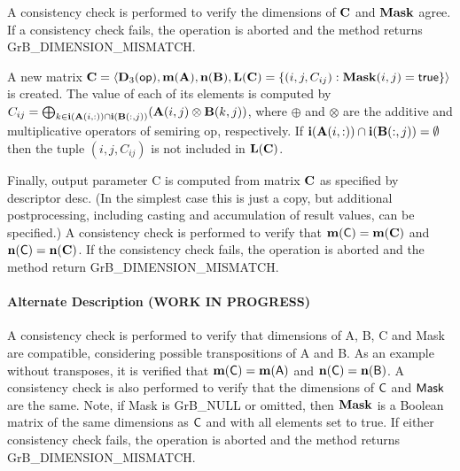 A consistency check is performed to verify the dimensions of ${\bf C}$
and ${\bf Mask}$ agree.  If a consistency check fails, the operation is
aborted and the method returns {\sf GrB\_DIMENSION\_MISMATCH}.

A new matrix ${\bf C} = \langle \bold{D}_3({\sf op}),
\bold{m}({\bf A}), \bold{n}({\bf B}), \bold{L}({\bf C}) = \{(i,j,C_{ij}) : {\bf Mask}(i,j)
= {\sf true} \} \rangle$ is created.  The value of each of its elements
is computed by $C_{ij} = \bigoplus_{k \in {\bf i}({\bf A}(i,:)) \cap
{\bf i}({\bf B}(:,j))} ({\bf A}(i,j) \otimes {\bf B}(k,j))$,
where $\oplus$ and $\otimes$ are the additive and multiplicative
operators of semiring {\sf op}, respectively.  If ${\bf i}({\bf A}(i,:)) \cap {\bf i}({\bf B}(:,j)) = \emptyset $ then the tuple $(i,j,C_{ij})$
is not included in $\bold{L}({\bf C})$.

Finally, output parameter {\sf C} is computed from matrix ${\bf C}$
as specified by descriptor {\sf desc}. (In the simplest case this
is just a copy, but additional postprocessing, including casting and
accumulation of result values, can be specified.)  A consistency check is
performed to verify that $\bold{m}({\sf C}) = \bold{m}({\bf C})$ and $\bold{n}({\sf C}) = \bold{n}({\bf C})$. If
the consistency check fails, the operation is aborted and the method
return {\sf GrB\_DIMENSION\_MISMATCH}.

\paragraph{Alternate Description (WORK IN PROGRESS)}

A consistency check is performed to verify that dimensions of {\sf A}, {\sf B}, {\sf C}
and {\sf Mask} are compatible, considering possible transpositions of {\sf A} and 
{\sf B}.  As an example without transposes, it is verified that 
$\bold{m}({\sf C}) = \bold{m}(\sf A)$ and $\bold{n}({\sf C}) = \bold{n}(\sf B)$. 
A consistency check is also performed to verify that the dimensions of $\sf C$ and 
$\sf Mask$ are the same.  Note, if {\sf Mask} is {\sf GrB\_NULL} or omitted,
then ${\bf Mask}$ is a Boolean matrix of the same dimensions as $\sf C$
and with all elements set to {\sf true}. If either consistency check fails, the operation is
aborted and the method returns {\sf GrB\_DIMENSION\_MISMATCH}.

